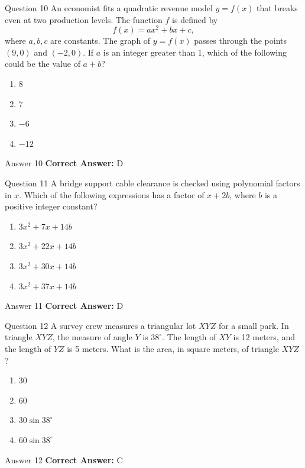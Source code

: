 \documentclass{beamer}
\begin{document}
\begin{frame}{Question 10}
\small
An economist fits a quadratic revenue model \(y = f(x)\) that breaks even at two production levels. The function \(f\) is defined by
\[
f(x) = ax^2 + bx + c,
\]
where \(a, b, c\) are constants. The graph of \(y = f(x)\) passes through the points \((9, 0)\) and \((-2, 0)\). If \(a\) is an integer greater than 1, which of the following could be the value of \(a + b\)?
\vspace{0.35cm}
\begin{enumerate}
    \item[A.] \(8\)
    \item[B.] \(7\)
    \item[C.] \(-6\)
    \item[D.] \(-12\)
\end{enumerate}
\end{frame}
\begin{frame}{Answer 10}
\small
\textbf{Correct Answer:} D
\end{frame}

\begin{frame}{Question 11}
\small
A bridge support cable clearance is checked using polynomial factors in \(x\). Which of the following expressions has a factor of \(x + 2b\), where \(b\) is a positive integer constant?
\vspace{0.35cm}
\begin{enumerate}
    \item[A.] \(3x^2 + 7x + 14b\)
    \item[B.] \(3x^2 + 22x + 14b\)
    \item[C.] \(3x^2 + 30x + 14b\)
    \item[D.] \(3x^2 + 37x + 14b\)
\end{enumerate}
\end{frame}
\begin{frame}{Answer 11}
\small
\textbf{Correct Answer:} D
\end{frame}

\begin{frame}{Question 12}
\small
A survey crew measures a triangular lot \(XYZ\) for a small park. In triangle \(XYZ\), the measure of angle \(Y\) is \(38^\circ\). The length of \(XY\) is 12 meters, and the length of \(YZ\) is 5 meters. What is the area, in square meters, of triangle \(XYZ\)?
\vspace{0.35cm}
\begin{enumerate}
    \item[A.] \(30\)
    \item[B.] \(60\)
    \item[C.] \(30 \sin 38^\circ\)
    \item[D.] \(60 \sin 38^\circ\)
\end{enumerate}
\end{frame}
\begin{frame}{Answer 12}
\small
\textbf{Correct Answer:} C
\end{frame}
\end{document}
